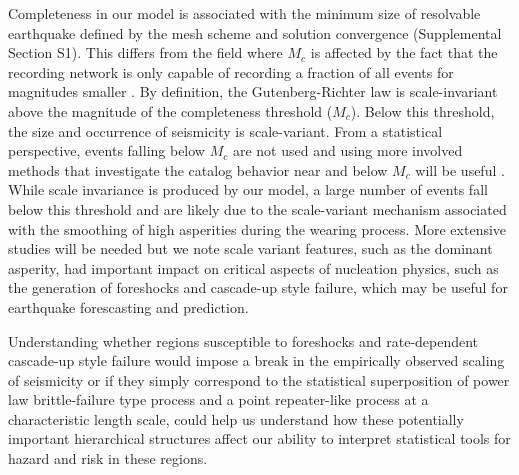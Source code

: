 \documentclass[preprint,1p, 10pt,authoryear]{elsarticle}
\begin{document}
Completeness in our model is associated with the minimum size of resolvable earthquake defined by the mesh scheme and solution convergence (Supplemental Section S1). This differs from the field where $M_{c}$ is affected by the fact that the recording network is only capable of recording a fraction of all events for magnitudes smaller \citep{Wiemer2002}. By definition, the Gutenberg-Richter law is scale-invariant above the magnitude of the completeness threshold ($M_{c}$). Below this threshold, the size and occurrence of seismicity is scale-variant. From a statistical perspective, events falling below $M_{c}$ are not used and using more involved methods that investigate the catalog behavior near and below $M_{c}$ will be useful \citep{Mignan2012, Mignan2020}. While scale invariance is produced by our model, a large number of events fall below this threshold and are likely due to the scale-variant mechanism associated with the smoothing of high asperities during the wearing process. More extensive studies will be needed but we note scale variant features, such as the dominant asperity, had important impact on critical aspects of nucleation physics, such as the generation of foreshocks and cascade-up style failure, which may be useful for earthquake forescasting and prediction. 

Understanding whether regions susceptible to foreshocks and rate-dependent cascade-up style failure would impose a break in the empirically observed scaling of seismicity \citep{Scholz1997} or if they simply correspond to the statistical superposition of power law brittle-failure type process and a point repeater-like process at a characteristic length scale, could help us understand how these potentially important hierarchical structures affect our ability to interpret statistical tools for hazard and risk in these regions.



\end{document}
